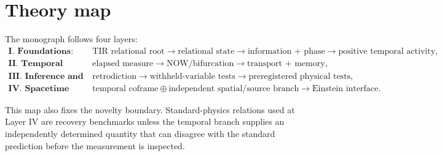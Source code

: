 \section*{Theory map}

The monograph follows four layers:
\[
\boxed{
\begin{aligned}
\textbf{I. Foundations:}\quad&
\text{TIR relational root}
\to
\text{relational state}
\to
\text{information + phase}
\to
\text{positive temporal activity},
\\[1mm]
\textbf{II. Temporal dynamics:}\quad&
\text{elapsed measure}
\to
\text{NOW/bifurcation}
\to
\text{transport + memory},
\\[1mm]
\textbf{III. Inference and experiment:}\quad&
\text{retrodiction}
\to
\text{withheld-variable tests}
\to
\text{preregistered physical tests},
\\[1mm]
\textbf{IV. Spacetime closure:}\quad&
\text{temporal coframe}
\oplus
\text{independent spatial/source branch}
\to
\text{Einstein interface}.
\end{aligned}}
\]

This map also fixes the novelty boundary. Standard-physics relations used at Layer IV are recovery benchmarks unless the temporal branch supplies an independently determined quantity that can disagree with the standard prediction before the measurement is inspected.
